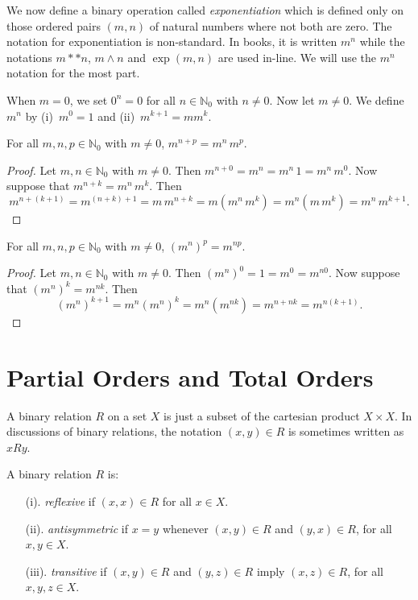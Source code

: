 We now define a binary operation called \textit{exponentiation}
which is defined only on those ordered pairs $(m,n)$ of natural
numbers where not both are zero.  The notation for exponentiation
is non-standard.  In books, it is written $m^n$ while the notations
$m**n$, $m\wedge n$ and $\exp(m,n)$ are used in-line.  We will use
the $m^n$ notation for the most part.

When $m=0$, we set $0^n=0$ for all $n\in\mathbb{N}_0$
with $n\neq0$.  Now let $m\neq0$.  We define $m^n$ by
(i)~$m^0=1$ and (ii)~$m^{k+1}=mm^k$.

\begin{theorem}
For all $m,n,p\in\mathbb{N}_0$ with $m\neq0$,
$m^{n+p}=m^n\,m^p$.
\end{theorem}

\begin{proof}
Let $m,n\in\mathbb{N}_0$ with $m\neq0$.  Then
$m^{n+0}=m^n=m^n\,1=m^n\,m^0$.
Now suppose that $m^{n+k}=m^n\,m^k$.
Then
\[
m^{n+(k+1)}=m^{(n+k)+1}=m\,m^{n+k}
 = m(m^n\,m^k)=m^n(m\,m^k)=m^n\,m^{k+1}.
\]
\end{proof}

\begin{theorem}
For all $m,n,p\in\mathbb{N}_0$ with $m\neq0$,
$(m^n)^p=m^{np}$.
\end{theorem}
\begin{proof}
Let $m,n\in\mathbb{N}_0$ with $m\neq0$.  Then
$(m^n)^0=1=m^0=m^{n0}$.  Now suppose that $(m^n)^k=m^{nk}$.
Then 
\[
(m^n)^{k+1}=m^n(m^n)^k=m^n(m^{nk})=m^{n+nk}=m^{n(k+1)}.
\]
\end{proof}

\section{Partial Orders and Total Orders}\label{s:order}

A binary relation $R$ on a set $X$ is just a subset of
the cartesian product $X\times X$.  In discussions of
binary relations, the notation $(x,y)\in R$ is sometimes
written as $xRy$.

A binary relation $R$ is:

\begin{enumerate} 
\item[(i).] \textit{reflexive} if $(x,x)\in R$ for
all $x\in X$.
\item[(ii).] \textit{antisymmetric} if $x=y$ whenever $(x,y)\in R$ and $(y,x)\in R$, for all $x,y\in X$.
\item[(iii).] \textit{transitive} if $(x,y)\in R$ and $(y,z)\in R$
imply $(x,z)\in R$, for all $x,y,z\in X$.
\end{enumerate}

